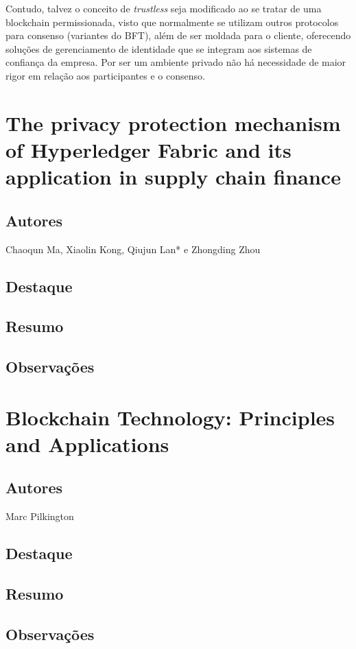 \documentclass[letterpaper, 12 pt, conference]{ieeeconf}
\begin{document}
        Contudo, talvez o conceito de \textit{trustless} seja modificado ao se tratar de uma blockchain permissionada, visto que normalmente se utilizam outros protocolos para consenso (variantes do BFT), além de ser moldada para o cliente, oferecendo soluções de gerenciamento de identidade que se integram aos sistemas de confiança da empresa. Por ser um ambiente privado não há necessidade de maior rigor em relação aos participantes e o consenso.

\section{The privacy protection mechanism of
Hyperledger Fabric and its application in
supply chain finance}
   \subsection{Autores} Chaoqun Ma, Xiaolin Kong, Qiujun Lan* e Zhongding Zhou
   \subsection{Destaque}
   \subsection{Resumo}
   \subsection{Observações}

\section{Blockchain Technology: Principles and Applications}
   \subsection{Autores} Marc Pilkington
   \subsection{Destaque}
   \subsection{Resumo}
   \subsection{Observações}
\end{document}
